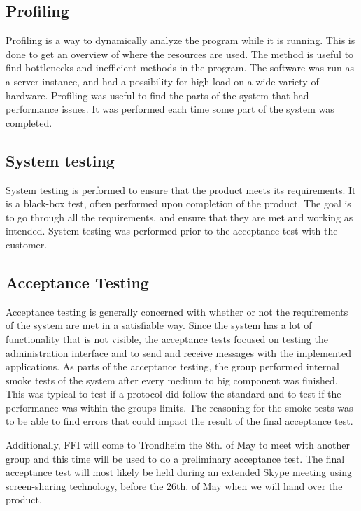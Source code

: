 \subsection{Profiling}
\label{subsec:testing-test_description-profiling}

Profiling is a way to dynamically analyze the program while it is running. This is done to get an overview of where the resources are used. The method is useful to find bottlenecks and inefficient methods in the program. The software was run as a server instance, and had a possibility for high load on a wide variety of hardware. Profiling was useful to find the parts of the system that had performance issues. It was performed each time some part of the system was completed.

\subsection{System testing}
\label{subsec:testing-test_description-system_testing}

System testing is performed to ensure that the product meets its requirements. It is a black-box test, often performed upon completion of the product. The goal is to go through all the requirements, and ensure that they are met and working as intended. System testing was performed prior to the acceptance test with the customer.

\subsection{Acceptance Testing}
\label{subsec:testing-test_description-acceptance_testing}
Acceptance testing is generally concerned with whether or not the requirements of the system are met in a satisfiable way. Since the system has a lot of functionality that is not visible, the acceptance tests focused on testing the administration interface and to send and receive messages with the implemented applications.
As parts of the acceptance testing, the group performed internal smoke tests of the system after every medium to big component was finished. This was typical to test if a protocol did follow the standard and to test if the performance was within the groups limits. The reasoning for the smoke tests was to be able to find errors that could impact the result of the final acceptance test.

Additionally, FFI will come to Trondheim the 8th. of May to meet with another group and this time will be used to do a preliminary acceptance test. The final acceptance test will most likely be held during an extended Skype meeting using screen-sharing technology, before the 26th. of May when we will hand over the product.

